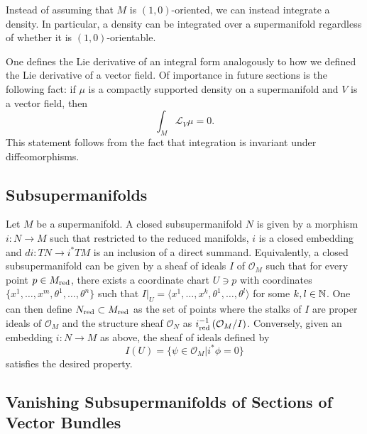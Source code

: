\documentclass[11pt]{amsart}
\numberwithin{equation}{section}
\numberwithin{figure}{section}
\theoremstyle{plain}
\theoremstyle{definition}
\theoremstyle{remark}
\begin{document}
Instead of assuming that $M$ is $(1,0)$-oriented, we can instead
integrate a density. In particular, a density can be integrated over
a supermanifold regardless of whether it is $(1,0)$-orientable. 

One defines the Lie derivative of an integral form analogously to
how we defined the Lie derivative of a vector field. Of importance
in future sections is the following fact: if $\mu$ is a compactly
supported density on a supermanifold and $V$ is a vector field, then
\[
\int_{M}\mathcal{L}_{V}\mu=0.
\]
This statement follows from the fact that integration is invariant
under diffeomorphisms. 


\subsection{Subsupermanifolds}

Let $M$ be a supermanifold. A closed subsupermanifold $N$ is given
by a morphism $i:N\rightarrow M$ such that restricted to the reduced
manifolds, $i$ is a closed embedding and $di:TN\rightarrow i^{*}TM$
is an inclusion of a direct summand. Equivalently, a closed subsupermanifold
can be given by a sheaf of ideals $I$ of $\mathcal{O}_{M}$ such
that for every point $p\in M_{\mathrm{red}}$, there exists a coordinate chart
$U\ni p$ with coordinates $\{x^{1},\dots,x^{m},\theta^{1},\dots,\theta^{n}\}$
such that $I|_{U}=\langle x^{1},\dots,x^{k},\theta^{1},\dots,\theta^{l}\rangle$
for some $k,l\in\mathbb{N}$. One can then define $N_{\mathrm{red}}\subset M_{\mathrm{red}}$
as the set of points where the stalks of $I$ are proper ideals of
$\mathcal{O}_{M}$ and the structure sheaf $\mathcal{O}_{N}$ as $i_{\mathrm{red}}^{-1}\left(\mathcal{O}_{M}/I\right)$.
Conversely, given an embedding $i:N\rightarrow M$ as above, the sheaf
of ideals defined by 
\[
I(U)=\{\psi\in\mathcal{O}_{M}|i^{*}\phi=0\}
\]
satisfies the desired property. 


\subsection{Vanishing Subsupermanifolds of Sections of Vector Bundles}
\end{document}
